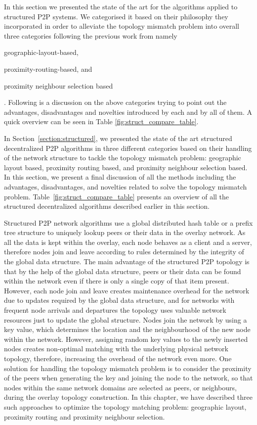 In this section we presented the state of the art for the algorithms applied to
structured P2P systems. We categorised it based on their philosophy they
incorporated in order to alleviate the topology mismatch problem into overall
three categories following the previous work from
\cite{castro_proximitydht_2002,castro_topawareroute_2002,ratnasamy_openq_2002}
namely
\begin{inparaenum}
  \item geographic-layout-based,
  \item proximity-routing-based, and
  \item proximity neighbour selection based
\end{inparaenum}
. Following is a discussion on the above categories trying to point out the
advantages, disadvantages and novelties introduced by each and by all of them.
A quick overview can be seen in Table \ref{fig:struct_compare_table}.

In Section~\ref{section:structured}, we presented the state of the art
structured decentralized P2P algorithms in three different categories based on
their handling of the network structure to tackle the topology mismatch problem:
geographic layout based, proximity routing based, and proximity neighbour
selection based. In this section, we present a final discussion of all the
methods including the advantages, disadvantages, and novelties related to solve
the topology mismatch problem. Table~\ref{fig:struct_compare_table} presents an
overview of all the structured decentralized algorithms described earlier in
this section.

Structured P2P network algorithms use a global distributed hash table or a
prefix tree structure to uniquely lookup peers or their data in the overlay
network. As all the data is kept within the overlay, each node behaves as a
client and a server, therefore nodes join and leave according to rules
determined by the integrity of the global data structure. The main advantage of
the structured P2P topology is that by the help of the global data structure,
peers or their data can be found within the network even if there is only a
single copy of that item present. However, each node join and leave creates
maintenance overhead for the network due to updates required by the global data
structure, and for networks with frequent node arrivals and departures the
topology uses valuable network resources just to update the global structure.
Nodes join the network by using a key value, which determines the location and
the neighbourhood of the new node within the network. However, assigning
random key values to the newly inserted nodes creates non-optimal matching with
the underlying physical network topology, therefore, increasing the overhead of
the network even more. One solution for handling the topology mismatch problem
is to consider the proximity of the peers when generating the key and joining
the node to the network, so that nodes within the same network domains are
selected as peers, or neighbours, during the overlay topology construction. In
this chapter, we have described three such approaches to optimize the topology
matching problem: geographic layout, proximity routing and proximity neighbour
selection.

